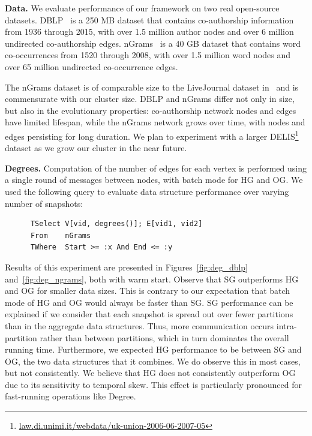 {\bf Data.}  We evaluate performance of our framework on two real
open-source datasets.
DBLP~\cite{dblp} is a 250 MB dataset that contains co-authorship
information from 1936 through 2015, with over 1.5 million author nodes
and over 6 million undirected co-authorship edges. 
%
nGrams~\cite{nGrams} is a 40 GB dataset that contains word
co-occurrences from 1520 through 2008, with over 1.5 million word
nodes and over 65 million undirected co-occurrence edges.

The nGrams dataset is of comparable size to the LiveJournal dataset
in~\cite{Xin2013} and is commensurate with our cluster size.  DBLP and
nGrams differ not only in size, but also in the evolutionary
properties: co-authorship network nodes and edges have limited
lifespan, while the nGrams network grows over time, with nodes and
edges persisting for long duration.  
We plan to experiment with a larger
DELIS\footnote{\url{law.di.unimi.it/webdata/uk-union-2006-06-2007-05}}
dataset as we grow our cluster in the near future.


{\bf Degrees.} Computation of the number of edges for each vertex is
performed using a single round of messages between nodes, with batch
mode for HG and OG.  We used the following query to evaluate data
structure performance over varying number of snapshots:

\begin{small}
\begin{verbatim}
      TSelect V[vid, degrees()]; E[vid1, vid2]
      From    nGrams
      TWhere  Start >= :x And End <= :y
\end{verbatim}
\end{small}

Results of this experiment are presented in Figures~\ref{fig:deg_dblp}
and~\ref{fig:deg_ngrams}, both with warm start.  Observe that SG
outperforms HG and OG for smaller data sizes.  This is contrary to our
expectation that batch mode of HG and OG would always be faster than
SG.  SG performance can be explained if we consider that each snapshot
is spread out over fewer partitions than in the aggregate data
structures.  Thus, more communication occurs intra-partition rather
than between partitions, which in turn dominates the overall running
time.  Furthermore, we expected HG performance to be between SG and
OG, the two data structures that it combines.  We do observe this in
most cases, but not consistently.  We believe that HG does not
consistently outperform OG due to its sensitivity to temporal skew.
This effect is particularly pronounced for fast-running operations
like Degree.


